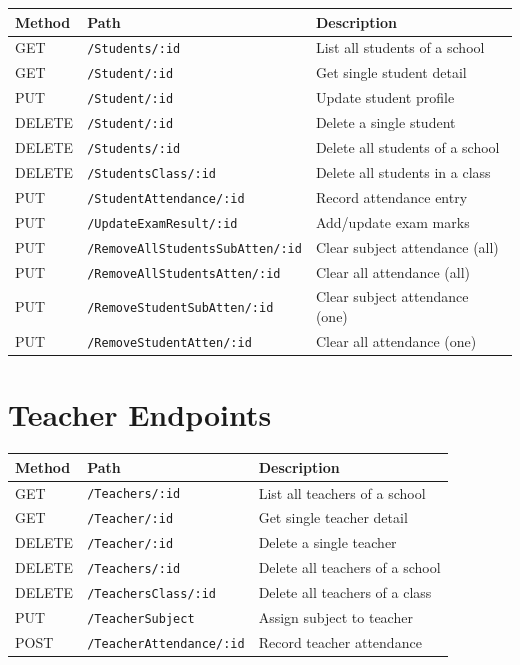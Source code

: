 \documentclass[12pt,a4paper]{report}
\begin{document}
\begin{longtable}{@{}p{1.5cm}p{6.5cm}p{6cm}@{}}
  \toprule
  \textbf{Method} & \textbf{Path} & \textbf{Description} \\
  \midrule
  \endhead
  GET    & \texttt{/Students/:id} & List all students of a school \\[3pt]
  GET    & \texttt{/Student/:id} & Get single student detail \\[3pt]
  PUT    & \texttt{/Student/:id} & Update student profile \\[3pt]
  DELETE & \texttt{/Student/:id} & Delete a single student \\[3pt]
  DELETE & \texttt{/Students/:id} & Delete all students of a school \\[3pt]
  DELETE & \texttt{/StudentsClass/:id} & Delete all students in a class \\[3pt]
  PUT    & \texttt{/StudentAttendance/:id} & Record attendance entry \\[3pt]
  PUT    & \texttt{/UpdateExamResult/:id} & Add/update exam marks \\[3pt]
  PUT    & \texttt{/RemoveAllStudentsSubAtten/:id} & Clear subject attendance (all) \\[3pt]
  PUT    & \texttt{/RemoveAllStudentsAtten/:id} & Clear all attendance (all) \\[3pt]
  PUT    & \texttt{/RemoveStudentSubAtten/:id} & Clear subject attendance (one) \\[3pt]
  PUT    & \texttt{/RemoveStudentAtten/:id} & Clear all attendance (one) \\
  \bottomrule
\end{longtable}

\section{Teacher Endpoints}

\begin{longtable}{@{}p{1.5cm}p{6.5cm}p{6cm}@{}}
  \toprule
  \textbf{Method} & \textbf{Path} & \textbf{Description} \\
  \midrule
  \endhead
  GET    & \texttt{/Teachers/:id} & List all teachers of a school \\[3pt]
  GET    & \texttt{/Teacher/:id} & Get single teacher detail \\[3pt]
  DELETE & \texttt{/Teacher/:id} & Delete a single teacher \\[3pt]
  DELETE & \texttt{/Teachers/:id} & Delete all teachers of a school \\[3pt]
  DELETE & \texttt{/TeachersClass/:id} & Delete all teachers of a class \\[3pt]
  PUT    & \texttt{/TeacherSubject} & Assign subject to teacher \\[3pt]
  POST   & \texttt{/TeacherAttendance/:id} & Record teacher attendance \\
  \bottomrule
\end{longtable}
\end{document}
